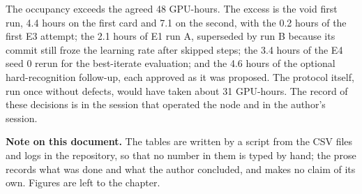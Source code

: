 \documentclass[11pt,a4paper]{article}
\begin{document}
The occupancy exceeds the agreed 48 GPU-hours. The excess is the void first run, 4.4 hours on the first card and 7.1 on the second, with the 0.2 hours of the first E3 attempt; the 2.1 hours of E1 run A, superseded by run B because its commit still froze the learning rate after skipped steps; the 3.4 hours of the E4 seed 0 rerun for the best-iterate evaluation; and the 4.6 hours of the optional hard-recognition follow-up, each approved as it was proposed. The protocol itself, run once without defects, would have taken about 31 GPU-hours. The record of these decisions is in the session that operated the node and in the author's session.

\medskip
\noindent\textbf{Note on this document.} The tables are written by a script from the CSV files and logs in the repository, so that no number in them is typed by hand; the prose records what was done and what the author concluded, and makes no claim of its own. Figures are left to the chapter.
\end{document}
